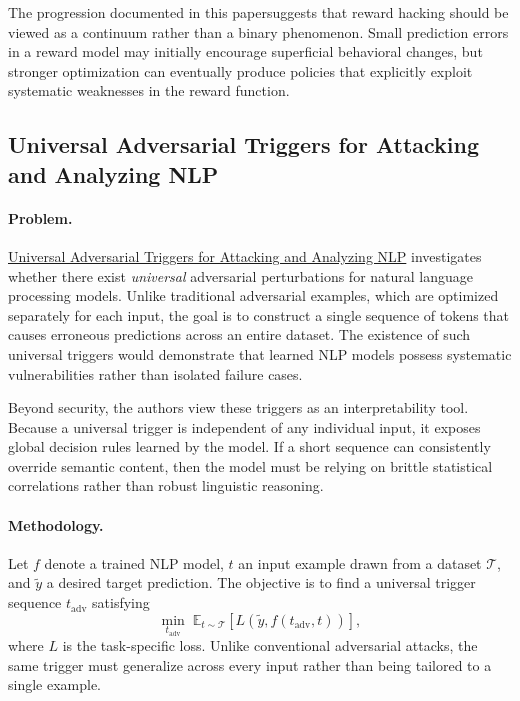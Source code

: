\documentclass[11pt]{article}
\begin{document}
The progression documented in this papersuggests that reward hacking should be viewed as a continuum rather than a binary phenomenon. Small prediction errors in a reward model may initially encourage superficial behavioral changes, but stronger optimization can eventually produce policies that explicitly exploit systematic weaknesses in the reward function.

\subsection{Universal Adversarial Triggers for Attacking and Analyzing NLP}


\paragraph{Problem.}
\href{https://arxiv.org/pdf/1908.07125}{Universal Adversarial Triggers for Attacking and Analyzing NLP}
 investigates whether there exist \emph{universal} adversarial perturbations for natural language processing models. Unlike traditional adversarial examples, which are optimized separately for each input, the goal is to construct a single sequence of tokens that causes erroneous predictions across an entire dataset. The existence of such universal triggers would demonstrate that learned NLP models possess systematic vulnerabilities rather than isolated failure cases.

Beyond security, the authors view these triggers as an interpretability tool. Because a universal trigger is independent of any individual input, it exposes global decision rules learned by the model. If a short sequence can consistently override semantic content, then the model must be relying on brittle statistical correlations rather than robust linguistic reasoning.

\paragraph{Methodology.}
Let \(f\) denote a trained NLP model, \(t\) an input example drawn from a dataset \(\mathcal{T}\), and \(\tilde{y}\) a desired target prediction. The objective is to find a universal trigger sequence \(t_{\mathrm{adv}}\) satisfying
\[
\min_{t_{\mathrm{adv}}}
\;
\mathbb{E}_{t\sim\mathcal{T}}
\left[
L\!\left(
\tilde{y},
f(t_{\mathrm{adv}},t)
\right)
\right],
\]
where \(L\) is the task-specific loss. Unlike conventional adversarial attacks, the same trigger must generalize across every input rather than being tailored to a single example.
\end{document}

